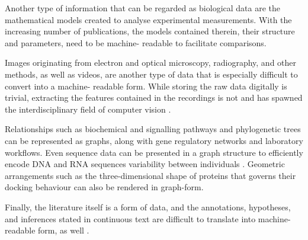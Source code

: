 \noindent
Another\label{mar:datamodels} type of information that can
be regarded as biological data are the mathematical models created to analyse
experimental measurements. With the increasing number of publications, the
models contained therein, their structure and parameters, need to be machine-
readable to facilitate comparisons.
\medbreak

\noindent
Images\label{mar:dataimages} originating from electron and
optical microscopy, radiography, and other methods, as well as videos, are
another type of data that is especially difficult to convert into a machine-%
readable form. While storing the raw data digitally is trivial, extracting the
features contained in the recordings is not and has spawned the
interdisciplinary field of computer vision \citep{Ballard1982}.
\medbreak

\noindent
Relationships\label{mar:datagraphs} such as biochemical and
signalling pathways and phylogenetic trees can be represented as graphs, along
with gene regulatory networks and laboratory workflows. Even sequence data can
be presented in a graph structure to efficiently encode DNA and RNA sequences
variability between individuals \citep{Novak2017}. Geometric arrangements such
as the three-dimensional shape of proteins that governs their docking
behaviour can also be rendered in graph-form.
\medbreak

\noindent
Finally,\label{mar:dataprose} the literature itself is a
form of data, and the annotations, hypotheses, and inferences stated in
continuous text are difficult to translate into machine-readable form, as well
\citep{Balyan2017}.
\bigbreak

